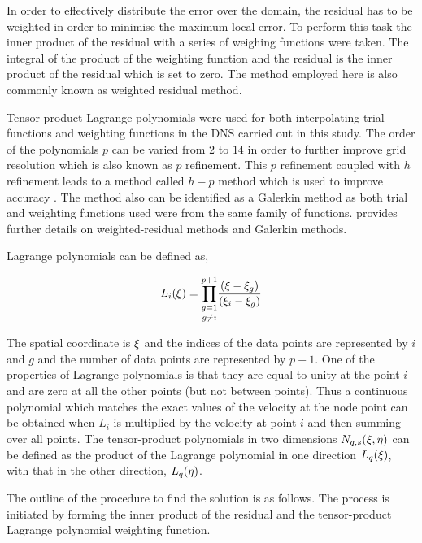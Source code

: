 In order to effectively distribute the error over the domain, the residual has to be weighted in order to minimise the maximum local error. To perform this task the inner product of the residual with a series of weighing functions were taken. The integral of the product of the weighting  function and the residual is the inner product of the residual which is set to zero. The method employed here is also commonly known as weighted residual method. 

Tensor-product Lagrange polynomials were used for both interpolating trial functions and weighting functions in the DNS carried out in this study. The order of the polynomials $p$ can be varied from $2$ to $14$ in order to further improve grid resolution which is also known as $p$ refinement. This $p$ refinement coupled with $h$ refinement leads to a method called $h-p$ method which is used to improve accuracy \citep{karniadakis2005}. The method also can be identified as a Galerkin method as both trial and weighting functions used were from the same family of functions. \citet{Fletcher84,Fletcher91} provides further details on weighted-residual methods and Galerkin methods. 

Lagrange polynomials can be defined as, 

\begin{equation} \centering
\label{eq:lagrange}
L_{i}(\compone) = \underset{g\neq i}{\prod_{g=1}^{p+1}}\frac{(\compone-\compone_{g})}{(\compone_{i}-\compone_{g})}
\end{equation}

The spatial coordinate is $\xi$ and the indices of the data points are represented by $i$ and $g$ and the number of data points are represented by $p+1$. One of the properties of Lagrange polynomials is that they are equal to unity at the point $i$ and are zero at all the other points (but not between points). Thus a continuous polynomial which matches the exact values of the velocity at the node point  can be obtained when  $L_{i}$ is multiplied by the velocity at point $i$ and then summing over all points. The tensor-product polynomials in two dimensions $N_{q,s}(\xi, \eta)$ can be defined as the product of the Lagrange polynomial in one direction $L_{q}(\xi)$, with that in the other direction, $L_{q}(\eta)$.

The outline of the procedure to find the solution is as follows. The process is initiated by forming the inner product of the residual and the tensor-product Lagrange polynomial weighting function.

